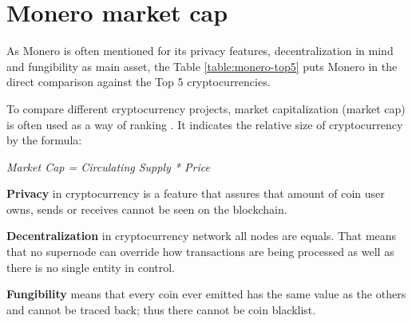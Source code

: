 \documentclass[
  printed, %
  table,   %
  lof,     %
  lot,     %
           oneside, color
]{fithesis3}
\begin{document}

\section{Monero market cap}
 As Monero is often mentioned for its privacy features, decentralization in mind and fungibility as main asset, the Table \ref{table:monero-top5} puts Monero in the direct comparison against the Top 5 cryptocurrencies.

To compare different cryptocurrency projects, market capitalization (market cap) is often used as a way of ranking \cite{elbahrawy2017evolutionary}. It indicates the relative size of cryptocurrency by the formula: \\ \centerline{
 \textit{\textit{Market Cap = Circulating Supply * Price} }}
 
\textbf{Privacy} in cryptocurrency is a feature that assures that amount of coin user owns, sends or receives cannot be seen on the blockchain.

\textbf{Decentralization} in cryptocurrency network all nodes are equals. That means that no supernode can override how transactions are being processed as well as there is no single entity in control.

\textbf{Fungibility} means that every coin ever emitted has the same value as the others and cannot be traced back; thus there cannot be coin blacklist.
\end{document}
